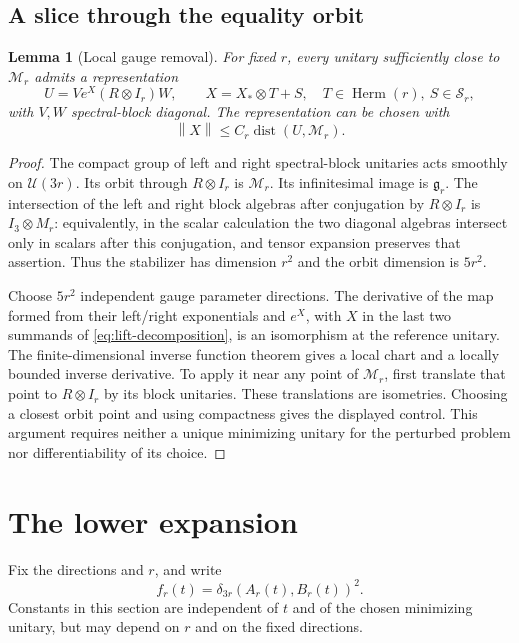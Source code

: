 \documentclass[11pt]{article}
\newtheorem{lemma}[theorem]{Lemma}
\theoremstyle{remark}\newtheorem{remark}[theorem]{Remark}
\newcommand{\U}{\mathcal U}
\newcommand{\Herm}{\operatorname{Herm}}
\newcommand{\dd}{\delta}
\newcommand{\norm}[1]{\left\lVert#1\right\rVert}
\newcommand{\gauge}{\mathfrak g}
\newcommand{\trans}{\mathcal S}
\begin{document}
\subsection{A slice through the equality orbit}
\begin{lemma}[Local gauge removal]\label{lem:slice}
For fixed $r$, every unitary sufficiently close to $\mathcal M_r$ admits a representation
\begin{equation}\label{eq:slice}
 U=V e^X(R\otimes I_r)W,\qquad
 X=X_*\otimes T+S,\quad T\in\Herm(r),\ S\in\trans_r,
\end{equation}
with $V,W$ spectral-block diagonal. The representation can be chosen with
\[
 \norm X\le C_r\operatorname{dist}(U,\mathcal M_r).
\]
\end{lemma}
\begin{proof}
The compact group of left and right spectral-block unitaries acts smoothly on $\U(3r)$. Its orbit through $R\otimes I_r$ is $\mathcal M_r$. Its infinitesimal image is $\gauge_r$. The intersection of the left and right block algebras after conjugation by $R\otimes I_r$ is $I_3\otimes M_r$: equivalently, in the scalar calculation the two diagonal algebras intersect only in scalars after this conjugation, and tensor expansion preserves that assertion. Thus the stabilizer has dimension $r^2$ and the orbit dimension is $5r^2$.

Choose $5r^2$ independent gauge parameter directions. The derivative of the map formed from their left/right exponentials and $e^X$, with $X$ in the last two summands of \eqref{eq:lift-decomposition}, is an isomorphism at the reference unitary. The finite-dimensional inverse function theorem gives a local chart and a locally bounded inverse derivative. To apply it near any point of $\mathcal M_r$, first translate that point to $R\otimes I_r$ by its block unitaries. These translations are isometries. Choosing a closest orbit point and using compactness gives the displayed control. This argument requires neither a unique minimizing unitary for the perturbed problem nor differentiability of its choice.
\end{proof}

\section{The lower expansion}
Fix the directions and $r$, and write
\[
 f_r(t)=\dd_{3r}(A_r(t),B_r(t))^2.
\]
Constants in this section are independent of $t$ and of the chosen minimizing unitary, but may depend on $r$ and on the fixed directions.
\end{document}
